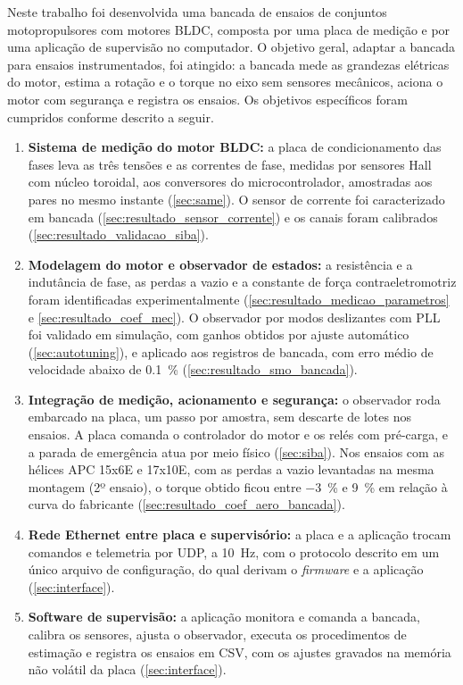 \label{sec:conclusoes}

Neste trabalho foi desenvolvida uma bancada de ensaios de conjuntos
motopropulsores com motores BLDC, composta por uma placa de medição e por uma
aplicação de supervisão no computador. O objetivo geral, adaptar a bancada para
ensaios instrumentados, foi atingido: a bancada mede as grandezas elétricas do
motor, estima a rotação e o torque no eixo sem sensores mecânicos, aciona o
motor com segurança e registra os ensaios. Os objetivos específicos foram
cumpridos conforme descrito a seguir.

\begin{enumerate}
    \item \textbf{Sistema de medição do motor BLDC:} a placa de condicionamento
    das fases leva as três tensões e as correntes de fase, medidas por sensores
    Hall com núcleo toroidal, aos conversores do microcontrolador, amostradas
    aos pares no mesmo instante (\autoref{sec:same}). O sensor de corrente foi
    caracterizado em bancada (\autoref{sec:resultado_sensor_corrente}) e os
    canais foram calibrados (\autoref{sec:resultado_validacao_siba}).

    \item \textbf{Modelagem do motor e observador de estados:} a resistência e
    a indutância de fase, as perdas a vazio e a constante de força
    contraeletromotriz foram identificadas experimentalmente
    (\autoref{sec:resultado_medicao_parametros} e
    \autoref{sec:resultado_coef_mec}). O observador por modos deslizantes com
    PLL foi validado em simulação, com ganhos obtidos por ajuste automático
    (\autoref{sec:autotuning}), e aplicado aos registros de bancada, com erro
    médio de velocidade abaixo de \SI{0,1}{\percent}
    (\autoref{sec:resultado_smo_bancada}).

    \item \textbf{Integração de medição, acionamento e segurança:} o observador
    roda embarcado na placa, um passo por amostra, sem descarte de lotes nos
    ensaios. A placa comanda o controlador do motor e os relés com pré-carga, e
    a parada de emergência atua por meio físico (\autoref{sec:siba}). Nos
    ensaios com as hélices APC 15x6E e 17x10E, com as perdas a vazio
    levantadas na mesma montagem (2º ensaio), o torque obtido ficou entre \SI{-3}{\percent} e
    \SI{+9}{\percent} em relação à curva do fabricante
    (\autoref{sec:resultado_coef_aero_bancada}).

    \item \textbf{Rede Ethernet entre placa e supervisório:} a placa e a
    aplicação trocam comandos e telemetria por UDP, a \SI{10}{\hertz}, com o
    protocolo descrito em um único arquivo de configuração, do qual derivam o
    \textit{firmware} e a aplicação (\autoref{sec:interface}).

    \item \textbf{Software de supervisão:} a aplicação monitora e comanda a
    bancada, calibra os sensores, ajusta o observador, executa os
    procedimentos de estimação e registra os ensaios em CSV, com os ajustes
    gravados na memória não volátil da placa (\autoref{sec:interface}).
\end{enumerate}

